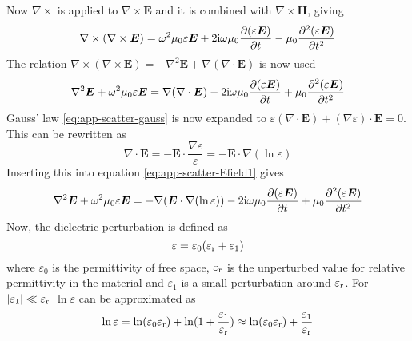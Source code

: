 \documentclass[11pt,twoside]{eitExjobb}
\begin{document}
	Now $\nabla \times$ is applied to $\nabla \times \bm{E}$ and it is combined with $\nabla \times \bm{H}$, giving
	\begin{equation*}
		\nabla \times (\nabla \times \bm{E}) = \omega^2 \mu_0 \varepsilon \bm{E} + 2\mathrm{i} \omega \mu_0 \frac{\partial (\varepsilon \bm{E})}{\partial t} - \mu_0 \frac{\partial^2 (\varepsilon \bm{E})}{\partial t^2}
	\end{equation*}
	The relation $\nabla \times (\nabla \times \bm{E}) = -\nabla^2\bm{E} + \nabla(\nabla \cdot \bm{E})$ is now used
	\begin{equation}
		\nabla^2\bm{E} + \omega^2 \mu_0 \varepsilon \bm{E} = \nabla(\nabla \cdot \bm{E}) - 2\mathrm{i} \omega \mu_0 \frac{\partial (\varepsilon \bm{E})}{\partial t} + \mu_0 \frac{\partial^2 (\varepsilon \bm{E})}{\partial t^2}
		\label{eq:app-scatter-Efield1}
	\end{equation}
	Gauss' law \eqref{eq:app-scatter-gauss} is now expanded to $\varepsilon(\nabla \cdot \bm{E}) + (\nabla \varepsilon) \cdot \bm{E} = 0$. This can be rewritten as
	\begin{equation*}
		\nabla \cdot \bm{E} = -\bm{E} \cdot \frac{\nabla \varepsilon}{\varepsilon} = -\bm{E} \cdot \nabla (\ln{\varepsilon})
	\end{equation*}
	Inserting this into equation \eqref{eq:app-scatter-Efield1} gives
	\begin{equation}
		\nabla^2\bm{E} + \omega^2 \mu_0 \varepsilon \bm{E} = -\nabla(\bm{E} \cdot \nabla (\ln{\varepsilon})) - 2\mathrm{i} \omega \mu_0 \frac{\partial (\varepsilon \bm{E})}{\partial t} + \mu_0 \frac{\partial^2 (\varepsilon \bm{E})}{\partial t^2}
		\label{eq:app-scatter-Efield2}
	\end{equation}
	Now, the dielectric perturbation is defined as
	\begin{equation}
		\varepsilon = \varepsilon_0(\varepsilon_{\mathrm{r}} + \varepsilon_1)
		\label{eq:app-scatter-eps}
	\end{equation}
	where $\varepsilon_0$ is the permittivity of free space, $\varepsilon_{\mathrm{r}}$ is the unperturbed value for relative permittivity in the material and $\varepsilon_1$ is a small perturbation around $\varepsilon_{\mathrm{r}}$. For $|\varepsilon_1| \ll \varepsilon_{\mathrm{r}}$ $\ln{\varepsilon}$ can be approximated as
	\begin{equation*}
		\ln{\varepsilon} = \ln(\varepsilon_0 \varepsilon_{\mathrm{r}}) + \ln(1 + \frac{\varepsilon_1}{\varepsilon_{\mathrm{r}}}) \approx \ln(\varepsilon_0 \varepsilon_{\mathrm{r}}) + \frac{\varepsilon_1}{\varepsilon_{\mathrm{r}}}
	\end{equation*}
\end{document}
